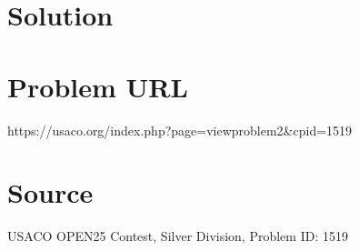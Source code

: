 \documentclass[12pt]{article}
\begin{document}
\section*{Solution}


\section*{Problem URL}
https://usaco.org/index.php?page=viewproblem2&cpid=1519

\section*{Source}
USACO OPEN25 Contest, Silver Division, Problem ID: 1519
\end{document}
